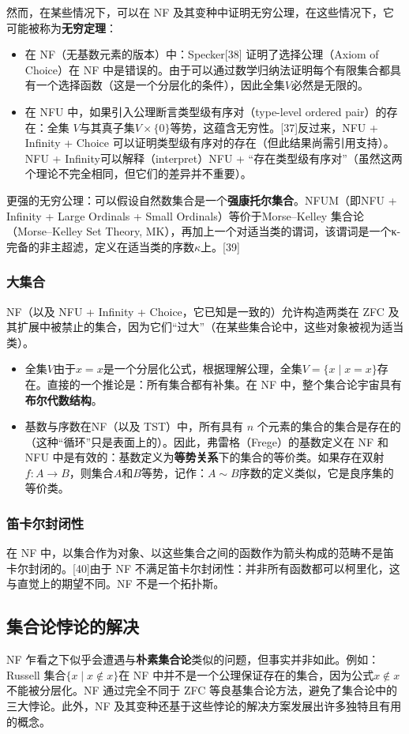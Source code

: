 然而，在某些情况下，可以在 NF 及其变种中证明无穷公理，在这些情况下，它可能被称为\textbf{无穷定理}：
\begin{itemize}
\item 在 NF（无基数元素的版本）中：Specker[38] 证明了选择公理（Axiom of Choice）在 NF 中是错误的。由于可以通过数学归纳法证明每个有限集合都具有一个选择函数（这是一个分层化的条件），因此全集\(V\)必然是无限的。
\item 在 NFU 中，如果引入公理断言类型级有序对（type-level ordered pair）的存在：全集 \(V\)与其真子集\( V \times \{0\} \)等势，这蕴含无穷性。[37]反过来，NFU + Infinity + Choice 可以证明类型级有序对的存在（但此结果尚需引用支持）。NFU + Infinity可以解释（interpret）NFU + “存在类型级有序对”（虽然这两个理论不完全相同，但它们的差异并不重要）。
\end{itemize}
更强的无穷公理：可以假设自然数集合是一个\textbf{强康托尔集合}。NFUM（即NFU + Infinity + Large Ordinals + Small Ordinals）等价于Morse–Kelley 集合论（Morse–Kelley Set Theory, MK），再加上一个对适当类的谓词，该谓词是一个κ-完备的非主超滤，定义在适当类的序数\(\kappa\)上。[39]
\subsubsection{大集合}
NF（以及 NFU + Infinity + Choice，它已知是一致的）允许构造两类在 ZFC 及其扩展中被禁止的集合，因为它们“过大”（在某些集合论中，这些对象被视为适当类）。
\begin{itemize}
\item 全集\( V \)由于\( x = x \)是一个分层化公式，根据理解公理，全集\(V = \{x \mid x = x\}\)存在。直接的一个推论是：所有集合都有补集。在 NF 中，整个集合论宇宙具有\textbf{布尔代数结构}。
\item 基数与序数在NF（以及 TST）中，所有具有 \( n \) 个元素的集合的集合是存在的（这种“循环”只是表面上的）。因此，弗雷格（Frege）的基数定义在 NF 和 NFU 中是有效的：基数定义为\textbf{等势关系}下的集合的等价类。如果存在双射\( f: A \to B\)，则集合\( A \)和\( B \)等势，记作：\(A \sim B\)序数的定义类似，它是良序集的等价类。
\end{itemize}
\subsubsection{笛卡尔封闭性} 
在 NF 中，以集合作为对象、以这些集合之间的函数作为箭头构成的范畴不是笛卡尔封闭的。[40]由于 NF 不满足笛卡尔封闭性：并非所有函数都可以柯里化，这与直觉上的期望不同。NF 不是一个拓扑斯。
\subsection{集合论悖论的解决} 
NF 乍看之下似乎会遭遇与\textbf{朴素集合论}类似的问题，但事实并非如此。例如：Russell 集合\(\{x \mid x \notin x\}\)在 NF 中并不是一个公理保证存在的集合，因为公式\( x \notin x \)不能被分层化。NF 通过完全不同于 ZFC 等良基集合论方法，避免了集合论中的三大悖论。此外，NF 及其变种还基于这些悖论的解决方案发展出许多独特且有用的概念。
